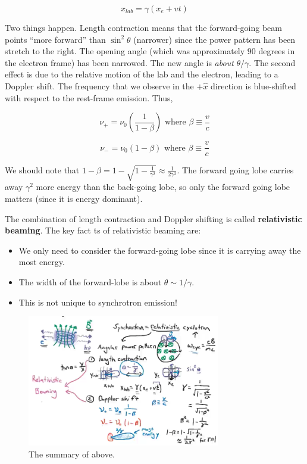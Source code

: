 \documentclass{article}
\begin{document}
$$
x_{lab} = \gamma \left(x_e + vt\right)
$$

Two things happen. Length contraction means that the forward-going beam points ``more forward'' than $\sin^2\theta$ (narrower) since the power pattern has been stretch to the right. The opening angle (which was approximately $90$ degrees in the electron frame) has been narrowed. The new angle is \textit{about} $\theta/\gamma$. The second effect is due to the relative motion of the lab and the electron, leading to a Doppler shift. The frequency that we observe in the $+\hat x$ direction is blue-shifted with respect to the rest-frame emission. Thus,

$$
\nu_+ = \nu_0 \left(\frac{1}{1-\beta}\right) \text{ where } \beta \equiv \frac{v}{c}
$$

$$
\nu_- = \nu_0 \left(1-\beta\right) \text{ where } \beta \equiv \frac{v}{c}
$$

We should note that $1 - \beta = 1 - \sqrt{1-\frac{1}{\gamma^2}} \approx \frac{1}{2\gamma^2}$. The forward going lobe carries away $\gamma^2$ more energy than the back-going lobe, so only the forward going lobe matters (since it is energy dominant). 

The combination of length contraction and Doppler shifting is called \textbf{relativistic beaming}. The key fact ts of relativistic beaming are:

\begin{itemize}
    \item We only need to consider the forward-going lobe since it is carrying away the most energy. 
    \item The width of the forward-lobe is about $\theta \sim 1/\gamma$.
    \item This is not unique to synchrotron emission!
\end{itemize}

\begin{figure}
    \centering
    \includegraphics[width=0.75\textwidth]{Screen Shot 2020-11-02 at 3.11.23 PM.png}
    \caption{The summary of above.}
    \label{fig:summmmmmmmm}
\end{figure}
\end{document}
